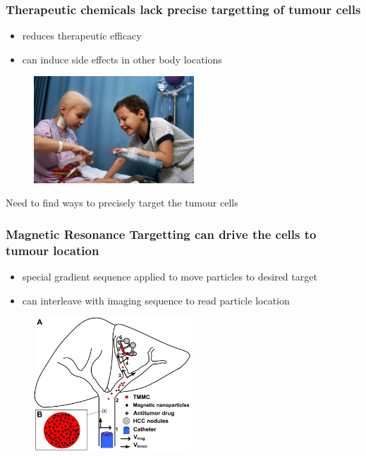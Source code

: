 \documentclass[8pt,xcolor=table]{beamer}
\begin{document}
\begin{frame}
\frametitle{Therapeutic chemicals lack precise targetting of tumour cells}

\begin{itemize}
 \item reduces therapeutic efficacy
 \item can induce side effects in other body locations
\end{itemize}

\begin{figure}
 \centering
\includegraphics[height=4cm]{hair_loss}
\end{figure}

Need to find ways to precisely target the tumour cells
\vspace{1em}



\end{frame}

\begin{frame}
\frametitle{Magnetic Resonance Targetting can drive the cells to tumour location}

\begin{itemize}
 \item special gradient sequence applied to move particles to desired target
 \item can interleave with imaging sequence to read particle location 
\end{itemize}


\begin{figure}
\centering
\includegraphics[height=5cm]{steering}
\end{figure}

 
\end{frame}
\end{document}
